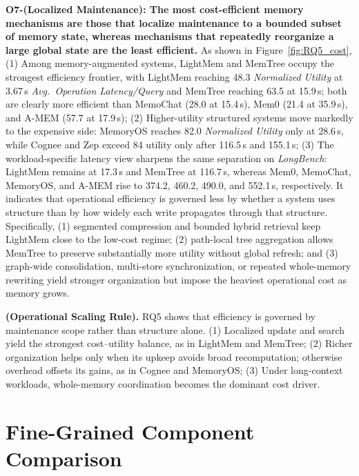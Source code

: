 \documentclass{llmxive}
\begin{document}
\noindent \textbf{O7-(Localized Maintenance): The most cost-efficient memory mechanisms are those that localize maintenance to a bounded subset of memory state, whereas mechanisms that repeatedly reorganize a large global state are the least efficient.}
As shown in Figure~\ref{fig:RQ5_cost}, (1) Among memory-augmented systems, LightMem and MemTree occupy the strongest efficiency frontier, with LightMem reaching 48.3 \textit{Normalized Utility} at 3.67\,s \textit{Avg.\ Operation Latency/Query} and MemTree reaching 63.5 at 15.9\,s; both are clearly more efficient than MemoChat (28.0 at 15.4\,s), Mem0 (21.4 at 35.9\,s), and A-MEM (57.7 at 17.9\,s);
(2) Higher-utility structured systems move markedly to the expensive side: MemoryOS reaches 82.0 \textit{Normalized Utility} only at 28.6\,s, while Cognee and Zep exceed 84 utility only after 116.5\,s and 155.1\,s;
(3) The workload-specific latency view sharpens the same separation on \textit{LongBench}: LightMem remains at 17.3\,s and MemTree at 116.7\,s, whereas Mem0, MemoChat, MemoryOS, and A-MEM rise to 374.2, 460.2, 490.0, and 552.1\,s, respectively.
It indicates that operational efficiency is governed less by whether a system uses structure than by how widely each write propagates through that structure.
Specifically, (1) segmented compression and bounded hybrid retrieval keep LightMem close to the low-cost regime;
(2) path-local tree aggregation allows MemTree to preserve substantially more utility without global refresh;
and (3) graph-wide consolidation, multi-store synchronization, or repeated whole-memory rewriting yield stronger organization but impose the heaviest operational cost as memory grows.

\begin{findingbox}
\textbf{(Operational Scaling Rule).}
RQ5 shows that efficiency is governed by maintenance scope rather than structure alone.
(1) Localized update and search yield the strongest cost--utility balance, as in LightMem and MemTree;
(2) Richer organization helps only when its upkeep avoids broad recomputation; otherwise overhead offsets its gains, as in Cognee and MemoryOS;
(3) Under long-context workloads, whole-memory coordination becomes the dominant cost driver.
\end{findingbox}

\section{Fine-Grained Component Comparison}
\label{sec:finegrained}
\end{document}
